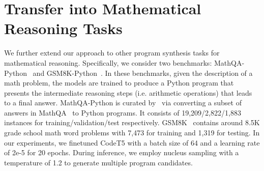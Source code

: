 \documentclass{article}
\begin{document}





\appendix

\iffalse
\section{Overview of Critic Model}
\label{app_sec:critic_model}

Figure \ref{fig:critic_model} shows an overview of our critic model.
In our CodeRL framework, besides the actor LM network , we introduce a critic model that is trained as an error predictor and parameterized as a neural network with parameters .
The critic receives as inputs a problem description  and a corresponding synthetic program  sampled from the actor. 
The critic is required to output a prediction of the unit test outcome of the input program.
We define 4 possible outcomes : \emph{CompileError}, \emph{RuntimeError}, \emph{FailedTest}, and \emph{PassedTest}.
The critic model is trained by minimizing the following loss: 

The ground-truth outcome of a synthetic sample is obtained by passing it to the unit tests corresponding to the problem.
Note that since our critic model is applied in a supervised learning environment with available ground truth, we also use the training samples from the original dataset with ground truth output  \emph{PassedTest} to train the critic.

The learned hidden state representations of program tokens when passed through the critic are then used to measure their return estimates for our RL optimization objective. 

\begin{figure}[htbp]
	\centering
	\resizebox{1.0\textwidth}{!} {
	\texttt{[image: figures/critic\_model\_v5.pdf]}
	}
	\caption{Overview of the critic model learning}
	\label{fig:critic_model}
\end{figure}
\fi

\iffalse
\section{Transfer into Mathematical Reasoning Tasks}
We further extend our approach to other program synthesis tasks  for mathematical reasoning. Specifically, we consider two benchmarks: MathQA-Python~\citep{austin2021program} and GSM8K-Python~\citep{palm}. In these benchmarks, given the description of a math problem, the models are trained to produce a Python program that presents the intermediate reasoning steps (i.e. arithmetic operations) that leads to a final answer. MathQA-Python is curated by~\citet{austin2021program} via converting a subset of answers in MathQA~\citep{mathqa} to Python programs. It consists of 19,209/2,822/1,883 instances for training/validation/test respectively. 
GSM8K~\citep{cobbe2021training} contains around 8.5K  grade school math word problems  with 7,473 for training and 1,319 for testing.
In our experiments, we finetuned CodeT5  with a batch size of 64 and a learning rate of 2e-5 for 20 epochs. During inference, we employ nucleus sampling with a temperature of 1.2 to generate multiple program candidates.
\end{document}
